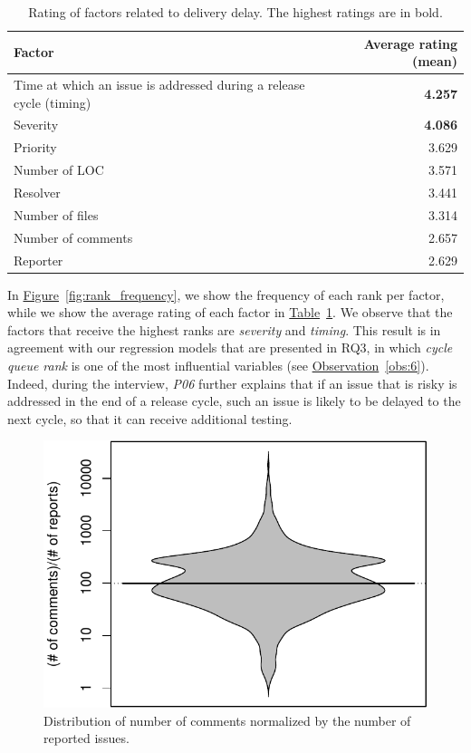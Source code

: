 \begin{sloppypar}
\begin{table}
	\footnotesize
	\centering
	\caption{Rating of factors related to delivery delay. The highest
		ratings are in bold.
		\label{tbl:factors}
	}
	\begin{tabular}{lr}
		\hline 
		\textbf{Factor} & \textbf{Average rating (mean)}\tabularnewline
		\hline 
		\hline 
		Time at which an issue is addressed during a release cycle (timing) & \textbf{4.257}\tabularnewline
		\hline 
		Severity & \textbf{4.086}\tabularnewline
		\hline 
		Priority & 3.629\tabularnewline
		\hline 
		Number of LOC & 3.571\tabularnewline
		\hline 
		Resolver & 3.441\tabularnewline
		\hline 
		Number of files & 3.314\tabularnewline
		\hline 
		Number of comments & 2.657\tabularnewline
		\hline 
		Reporter & 2.629\tabularnewline
		\hline 
	\end{tabular}
\end{table}

In \hyperref[fig:rank_frequency]{Figure}~\ref{fig:rank_frequency}, we show the
frequency of each rank per factor, while  we show the average rating of each
factor in \hyperref[tbl:factors]{Table}~\ref{tbl:factors}. We observe that the
factors that receive the highest ranks are {\em severity} and {\em timing}. This
result is in agreement with our regression models that are presented in RQ3, in
which {\em cycle queue rank} is one of the most influential variables
(see \hyperref[obs:6]{Observation}~\ref{obs:6}). Indeed, during the interview, {\em
P06} further explains that if an issue that is risky is addressed in the end of
a release cycle, such an issue is likely to be delayed to the next cycle, so
that it can receive additional testing.

\begin{figure}
	\centering
	\includegraphics[width=.8\textwidth,keepaspectratio]
	{chapters/chapter5/figures/comments_ratio.pdf}
	\caption{Distribution of number of comments normalized by the number of
	reported issues.}
	\label{fig:comments_ratio}
\end{figure}


\end{sloppypar}
